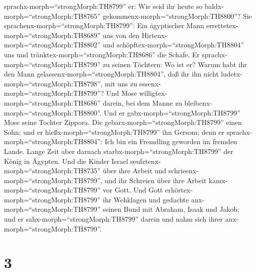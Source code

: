sprachx-morph=``strongMorph:TH8799'' er: Wie seid ihr heute so
baldx-morph=``strongMorph:TH8765''
gekommenx-morph=``strongMorph:TH8800''?  Sie
sprachenx-morph=``strongMorph:TH8799'': Ein ägyptischer Mann
errettetex-morph=``strongMorph:TH8689'' uns von den
Hirtenx-morph=``strongMorph:TH8802'' und
schöpftex-morph=``strongMorph:TH8804'' uns und
tränktex-morph=``strongMorph:TH8686'' die Schafe.  Er
sprachx-morph=``strongMorph:TH8799'' zu seinen Töchtern: Wo ist er?
Warum habt ihr den Mann gelassenx-morph=``strongMorph:TH8804'', daß ihr
ihn nicht ludetx-morph=``strongMorph:TH8798'', mit uns zu
essenx-morph=``strongMorph:TH8799''?  Und Mose
willigtex-morph=``strongMorph:TH8686'' darein, bei dem Manne zu
bleibenx-morph=``strongMorph:TH8800''. Und er
gabx-morph=``strongMorph:TH8799'' Mose seine Tochter Zippora.
 Die gebarx-morph=``strongMorph:TH8799'' einen Sohn; und er
hießx-morph=``strongMorph:TH8799'' ihn Gersom; denn er
sprachx-morph=``strongMorph:TH8804'': Ich bin ein Fremdling geworden im
fremden Lande.  Lange Zeit aber darnach
starbx-morph=``strongMorph:TH8799'' der König in Ägypten. Und die Kinder
Israel seufztenx-morph=``strongMorph:TH8735'' über ihre Arbeit und
schrieenx-morph=``strongMorph:TH8799'', und ihr Schreien über ihre
Arbeit kamx-morph=``strongMorph:TH8799'' vor Gott.  Und
Gott erhörtex-morph=``strongMorph:TH8799'' ihr Wehklagen und gedachte
anx-morph=``strongMorph:TH8799'' seinen Bund mit Abraham, Isaak und
Jakob;  und er sahx-morph=``strongMorph:TH8799'' darein und
nahm sich ihrer anx-morph=``strongMorph:TH8799''.

\hypertarget{section-2}{%
\section{3}\label{section-2}}

